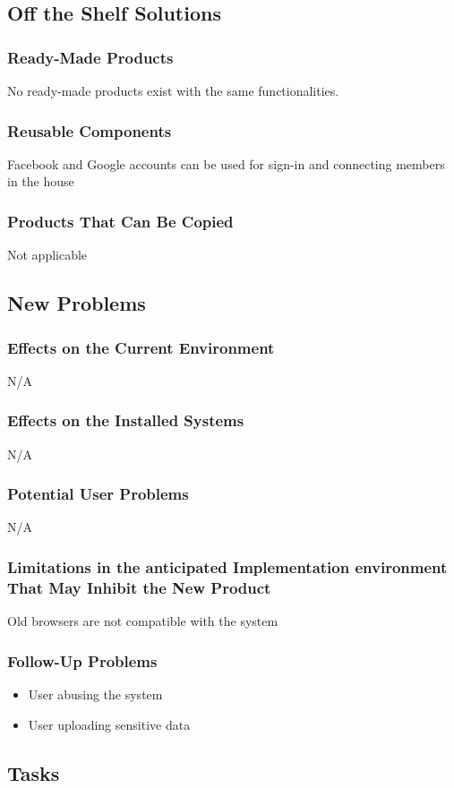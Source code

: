 \documentclass[12pt, titlepage]{article}
\begin{document}
{\subsection{Off the Shelf Solutions}
\subsubsection{Ready-Made Products}
No ready-made products exist with the same functionalities. 
\subsubsection{Reusable Components}
Facebook and Google accounts can be used for sign-in and connecting members in the house
\subsubsection{Products That Can Be Copied}
Not applicable
\subsection{New Problems}
\subsubsection{Effects on the Current Environment}
N/A
\subsubsection{Effects on the Installed Systems}
N/A
\subsubsection{Potential User Problems}
N/A
\subsubsection{Limitations in the anticipated Implementation environment That May Inhibit the New Product}
Old browsers are not compatible with the system
\subsubsection{Follow-Up Problems}
\begin{itemize}
	\item User abusing the system
	\item User uploading sensitive data 
\end{itemize}

\subsection{Tasks}
}
\end{document}
